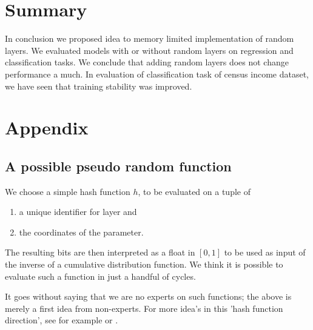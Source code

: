 \documentclass[]{article}
\begin{document}
\begin{multicols}{2}
	\section{Summary}
	In conclusion we proposed idea to memory limited implementation of random layers. We evaluated models with or without random layers on regression and classification tasks. We conclude that adding random layers does not change performance a much. In evaluation of classification task of census income dataset, we have seen that training stability was improved.
	
	\appendix
	\section{Appendix}
	\subsection{A possible pseudo random function}
	We choose a simple hash function $h$, to be evaluated on a tuple of
	\begin{enumerate}
		\itemsep0em
		\item a unique identifier for layer and
		\item the coordinates of the parameter.
	\end{enumerate}
	The resulting bits are then interpreted as a float in $[0, 1]$ to be used as input of the inverse of a cumulative distribution function. We think it is possible to evaluate such a function in just a handful of cycles.
	
	It goes without saying that we are no experts on such functions; the above is merely a first idea from non-experts. For more idea's in this 'hash function direction', see for example \cite{TAOCP364} or \cite{wiki:Hash_function}.

	
	
\end{multicols}
\end{document}
